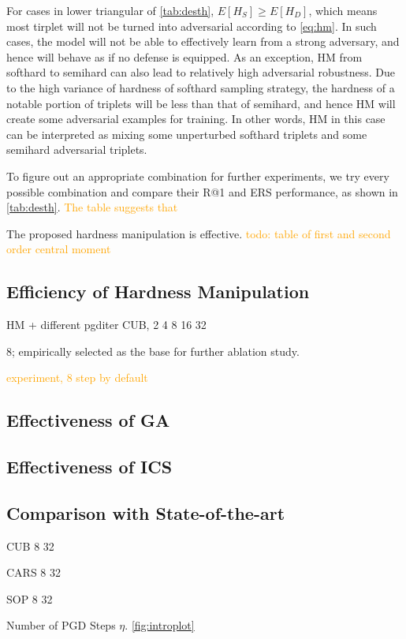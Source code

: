 \documentclass[10pt,twocolumn,letterpaper]{article}
\newcommand{\oo}[1]{\textcolor{orange}{#1}}
\begin{document}
For cases in lower triangular of \cref{tab:desth}, $E[H_S] \geqslant E[H_D]$,
which means most tirplet will not be turned into adversarial according to
\cref{eq:hm}.
%
In such cases, the model will not be able to effectively learn from a strong
adversary, and hence will behave as if no defense is equipped.
%
As an exception, HM from softhard to semihard can also lead to relatively high
adversarial robustness.
%
Due to the high variance of hardness of softhard sampling strategy, the
hardness of a notable portion of triplets will be less than that of semihard,
and hence HM will create some adversarial examples for training.
%
In other words, HM in this case can be interpreted as mixing some unperturbed
softhard triplets and some semihard adversarial triplets.

To figure out an appropriate combination for further experiments, we try
every possible combination and compare their R@1 and ERS performance, as
shown in \cref{tab:desth}.
%
\oo{The table suggests that}

The proposed hardness manipulation is effective.
\oo{todo: table of first and second order central moment}

\subsection{Efficiency of Hardness Manipulation}

HM + different pgditer
CUB, 2 4 8 16 32

8; empirically selected as the base for further ablation study.

\oo{experiment, 8 step by default}

\subsection{Effectiveness of GA}

\subsection{Effectiveness of ICS}

\subsection{Comparison with State-of-the-art}

CUB 8 32

CARS 8 32

SOP 8 32

Number of PGD Steps $\eta$.
\cref{fig:introplot}
\end{document}
